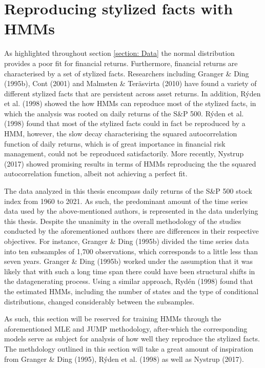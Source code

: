 \newpage

\section{Reproducing stylized facts with HMMs}
\label{Section: Stylized facts}
As highlighted throughout section \ref{section: Data} the normal distribution provides a poor fit for financial returns. Furthermore, financial returns are characterised by a set of stylized facts. Researchers including Granger \& Ding (1995b), Cont (2001) and Malmsten \& Teräsvirta (2010) have found a variety of different stylized facts that are persistent across asset returns. In addition, Rýden et al. (1998) showed the how HMMs can reproduce most of the stylized facts, in which the analysis was rooted on daily returns of the S\&P 500. Rýden et al. (1998) found that most of the stylized facts could in fact be reproduced by a HMM, however, the slow decay characterising the  squared autocorrelation function of daily returns, which is of great importance in financial risk management, could not be reproduced satisfactorily. More recently, Nystrup (2017) showed promising results in terms of HMMs reproducing the the squared autocorrelation function, albeit not achieving a perfect fit. 

The data analyzed in this thesis encompass daily returns of the S&P 500 stock index from 1960 to 2021. As such, the predominant amount of the time series data used by the above-mentioned authors, is represented in the data underlying this thesis. Despite the unanimity in the overall methodology of the studies conducted by the aforementioned authors there are differences in their respective objectives. For instance, Granger \& Ding (1995b) divided the time series data into ten subsamples of 1,700 observations, which corresponds to a little less than seven years. Granger \& Ding (1995b) worked under the assumption that it was likely that with such a long time span there could have been structural shifts in the datagenerating process. Using a similar approach, Rydén (1998) found that the estimated HMMs, including the number of states and the type of conditional distributions, changed considerably between the subsamples.

As such, this section will be reserved for training HMMs through the aforementioned MLE and JUMP methodology, after-which the corresponding models serve as subject for analysis of how well they reproduce the stylized facts. The methdology outlined in this section will take a great amount of inspiration from Granger \& Ding (1995), Rýden et al. (1998) as well as Nystrup (2017).

